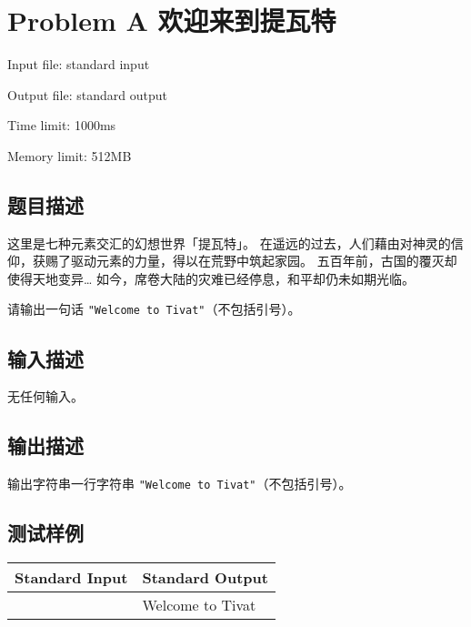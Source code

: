 \newpage
\section{Problem A 欢迎来到提瓦特}
{ \limitfont{}
Input file: standard input \par
Output file: standard output \par
Time limit: 1000ms \par
Memory limit: 512MB \par
}
\subsection*{题目描述}

这里是七种元素交汇的幻想世界「提瓦特」。
在遥远的过去，人们藉由对神灵的信仰，获赐了驱动元素的力量，得以在荒野中筑起家园。
五百年前，古国的覆灭却使得天地变异…
如今，席卷大陆的灾难已经停息，和平却仍未如期光临。

请输出一句话 \lstinline|"Welcome to Tivat"|（不包括引号）。

\subsection*{输入描述}

无任何输入。

\subsection*{输出描述}

输出字符串一行字符串 \lstinline|"Welcome to Tivat"|（不包括引号）。

\subsection*{测试样例}

\begin{table}[H]
    \begin{tabularx}{\textwidth}{|X|X|}
        \hline
        \textbf{Standard Input} & \textbf{Standard Output} \\ 
        \hline
         & Welcome to Tivat \\
         \hline
    \end{tabularx}
\end{table}